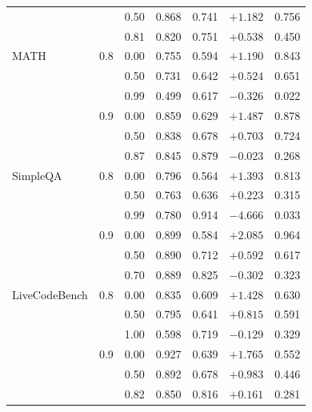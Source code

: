 \begin{longtable}{llrrrrr}
 &  & 0.50 & 0.868 & 0.741 & $+1.182$ & 0.756 \\
 &  & 0.81 & 0.820 & 0.751 & $+0.538$ & 0.450 \\
MATH & 0.8 & 0.00 & 0.755 & 0.594 & $+1.190$ & 0.843 \\
 &  & 0.50 & 0.731 & 0.642 & $+0.524$ & 0.651 \\
 &  & 0.99 & 0.499 & 0.617 & $-0.326$ & 0.022 \\
 & 0.9 & 0.00 & 0.859 & 0.629 & $+1.487$ & 0.878 \\
 &  & 0.50 & 0.838 & 0.678 & $+0.703$ & 0.724 \\
 &  & 0.87 & 0.845 & 0.879 & $-0.023$ & 0.268 \\
SimpleQA & 0.8 & 0.00 & 0.796 & 0.564 & $+1.393$ & 0.813 \\
 &  & 0.50 & 0.763 & 0.636 & $+0.223$ & 0.315 \\
 &  & 0.99 & 0.780 & 0.914 & $-4.666$ & 0.033 \\
 & 0.9 & 0.00 & 0.899 & 0.584 & $+2.085$ & 0.964 \\
 &  & 0.50 & 0.890 & 0.712 & $+0.592$ & 0.617 \\
 &  & 0.70 & 0.889 & 0.825 & $-0.302$ & 0.323 \\
LiveCodeBench & 0.8 & 0.00 & 0.835 & 0.609 & $+1.428$ & 0.630 \\
 &  & 0.50 & 0.795 & 0.641 & $+0.815$ & 0.591 \\
 &  & 1.00 & 0.598 & 0.719 & $-0.129$ & 0.329 \\
 & 0.9 & 0.00 & 0.927 & 0.639 & $+1.765$ & 0.552 \\
 &  & 0.50 & 0.892 & 0.678 & $+0.983$ & 0.446 \\
 &  & 0.82 & 0.850 & 0.816 & $+0.161$ & 0.281 \\
\end{longtable}
\endgroup
